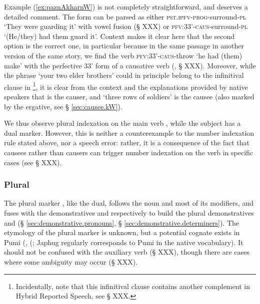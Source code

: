 Example (\ref{ex:paznAkharnW}) is not completely straightforward, and deserves a detailed comment. The form  can be parsed as either  \textsc{pst}.\textsc{ipfv}-\textsc{prog}-surround-\textsc{pl} `They were guarding it' with vowel fusion (§ XXX) or  \textsc{pfv}:3\fl{}3'-\textsc{caus}-surround-\textsc{pl} `(He/they) had them guard it'. Context makes it clear here that the second option is the correct one, in particular because in the same passage in another version of the same story, we find the verb  \textsc{pfv}:3\fl{}3'-\textsc{caus}-throw `he had (them) make' with the perfective 3\fl{}3' form of a causative verb (\citealt[242]{jacques16complementation}, § XXX). Moreover, while the phrase   `your two elder brothers' could in principle belong to the infinitival clause in \footnote{Incidentally, note that this infinitival clause contains another complement in Hybrid Reported Speech, see § XXX.}, it is clear from the context and the explanations provided by native speakers that  is the causer, and  `three rows of soldiers' is the causee (also marked by the ergative, see § \ref{sec:causee.kW}). 

We thus observe plural indexation  on the main verb , while the subject   has a dual marker. However, this is neither a counterexample to the number indexation rule stated above, nor a speech error: rather, it is a consequence of the fact that causees rather than causers can trigger number indexation on the verb in specific cases (see § XXX).

\subsubsection{Plural} \label{sec:plural.determiners}
The plural marker , like the dual, follows the noun and most of its modifiers, and fuses with the demonstratives  and  respectively to build the plural demonstratives  and  (§ \ref{sec:demonstrative.pronouns}, § \ref{sec:demonstrative.determiners}). The etymology of the plural marker  is unknown, but a potential cognate exists in Pumi (, (\citealt[135]{daudey14grammar}; Japhug  regularly corresponds to Pumi  in the native vocabulary). It should not be confused with the auxiliary verb  (§ XXX), though there are cases where some ambiguity may occur (§ XXX).

